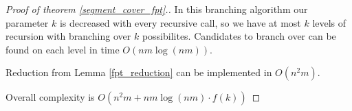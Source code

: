 \begin{proof}[Proof of theorem \ref{segment_cover_fpt}.]
In this branching algorithm our parameter $k$ is decreased with every
recursive call, so we have at most $k$ levels of recursion with
branching over $k$ possibilites. Candidates to branch over
can be found on each level in time $O(nm \log(nm))$.

Reduction from Lemma \ref{fpt_reduction} can be implemented in $O(n^2m)$.

Overall complexity is $O(n^2m + nm \log(nm) \cdot f(k))$
\end{proof}

